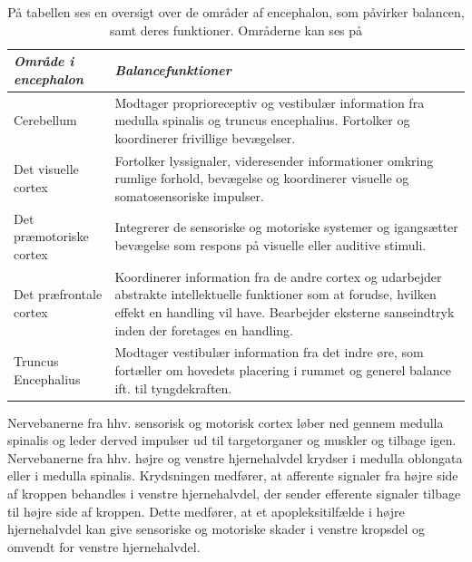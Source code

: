 \begin{table} [H]
	\centering
  \begin{tabular}{ | l | p{10cm} |} \hline
    \textit{Område i encephalon} & \textit{Balancefunktioner} \\ \hline
 	Cerebellum & Modtager proprioreceptiv og vestibulær information fra medulla spinalis og truncus encephalius.  Fortolker og koordinerer frivillige bevægelser. \\ \hline
 	Det visuelle cortex & Fortolker lyssignaler, videresender informationer omkring rumlige forhold, bevægelse og koordinerer visuelle og somatosensoriske impulser. \\ \hline
 	Det præmotoriske cortex & Integrerer de sensoriske og motoriske systemer og igangsætter bevægelse som respons på visuelle eller auditive stimuli. \\ \hline
 	Det præfrontale cortex & Koordinerer information fra de andre cortex og udarbejder abstrakte intellektuelle funktioner som at forudse, hvilken effekt en handling vil have. Bearbejder eksterne sanseindtryk inden der foretages en handling. \\ \hline
 	Truncus Encephalius & Modtager vestibulær information fra det indre øre, som fortæller om hovedets placering i rummet og generel balance ift. til tyngdekraften. \\
    \hline
    \end{tabular}
    \caption{På tabellen ses en oversigt over de områder af encephalon, som påvirker balancen, samt deres funktioner. Områderne kan ses på  \cite{Martini2012, Moos2010}}
    \label{tabelencephalon}
\end{table}
Nervebanerne fra hhv. sensorisk og motorisk cortex løber ned gennem medulla spinalis og leder derved impulser ud til targetorganer og muskler og tilbage igen. Nervebanerne fra hhv. højre og venstre hjernehalvdel krydser i medulla oblongata eller i medulla spinalis. Krydsningen medfører, at afferente signaler fra højre side af kroppen behandles i venstre hjernehalvdel, der sender efferente signaler tilbage til højre side af kroppen. \cite{Martini2012,Stanfield2014} Dette medfører, at et apopleksitilfælde i højre hjernehalvdel kan give sensoriske og motoriske skader i venstre kropsdel og omvendt for venstre hjernehalvdel. \cite{Nichols1997,Sundhedsstyrelsen2009} %

